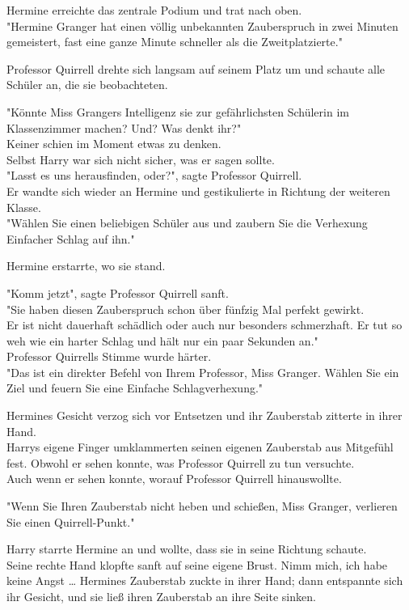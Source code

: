 {Hermine erreichte das zentrale Podium und trat nach oben.\\ "Hermine Granger hat einen völlig unbekannten Zauberspruch in zwei Minuten gemeistert, fast eine ganze Minute schneller als die Zweitplatzierte."

Professor Quirrell drehte sich langsam auf seinem Platz um und schaute alle Schüler an, die sie beobachteten.

"Könnte Miss Grangers Intelligenz sie zur gefährlichsten Schülerin im Klassenzimmer machen? Und? Was denkt ihr?"\\ Keiner schien im Moment etwas zu denken.\\ Selbst Harry war sich nicht sicher, was er sagen sollte.\\ "Lasst es uns herausfinden, oder?", sagte Professor Quirrell.\\ Er wandte sich wieder an Hermine und gestikulierte in Richtung der weiteren Klasse.\\ "Wählen Sie einen beliebigen Schüler aus und zaubern Sie die Verhexung Einfacher Schlag auf ihn."

Hermine erstarrte, wo sie stand.

"Komm jetzt", sagte Professor Quirrell sanft.\\ "Sie haben diesen Zauberspruch schon über fünfzig Mal perfekt gewirkt.\\ Er ist nicht dauerhaft schädlich oder auch nur besonders schmerzhaft. Er tut so weh wie ein harter Schlag und hält nur ein paar Sekunden an."\\ Professor Quirrells Stimme wurde härter.\\ "Das ist ein direkter Befehl von Ihrem Professor, Miss Granger. Wählen Sie ein Ziel und feuern Sie eine Einfache Schlagverhexung."

Hermines Gesicht verzog sich vor Entsetzen und ihr Zauberstab zitterte in ihrer Hand.\\ Harrys eigene Finger umklammerten seinen eigenen Zauberstab aus Mitgefühl fest. Obwohl er sehen konnte, was Professor Quirrell zu tun versuchte.\\ Auch wenn er sehen konnte, worauf Professor Quirrell hinauswollte.

"Wenn Sie Ihren Zauberstab nicht heben und schießen, Miss Granger, verlieren Sie einen Quirrell-Punkt."

Harry starrte Hermine an und wollte, dass sie in seine Richtung schaute.\\ Seine rechte Hand klopfte sanft auf seine eigene Brust. Nimm mich, ich habe keine Angst … Hermines Zauberstab zuckte in ihrer Hand; dann entspannte sich ihr Gesicht, und sie ließ ihren Zauberstab an ihre Seite sinken.

}
